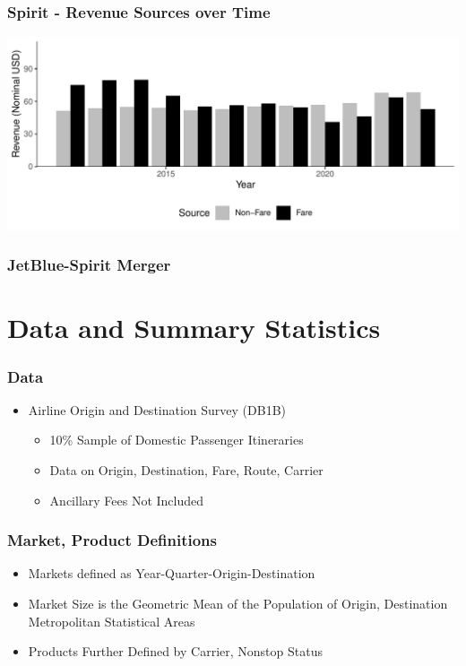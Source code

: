 \documentclass[xcolor=dvipsnames]{beamer}
\begin{document}
    \begin{frame}
     \frametitle{Spirit - Revenue Sources over Time}
        \includegraphics[width = \linewidth]{05.Figures/Spirit_Revenue_Sources.pdf}
    \end{frame}

    \begin{frame}
        \frametitle{JetBlue-Spirit Merger}
    \end{frame}


    \section{Data and Summary Statistics}

    \begin{frame}
		\frametitle{Data}
		\begin{itemize}
			\item Airline Origin and Destination Survey (DB1B)
			\begin{itemize}
				\item 10\% Sample of Domestic Passenger Itineraries 
				\item Data on Origin, Destination, Fare, Route, Carrier
                \item Ancillary Fees Not Included 
			\end{itemize}
		\end{itemize}
	\end{frame}


    \begin{frame}
        \frametitle{Market, Product Definitions}
        \begin{itemize}
        	\item Markets defined as Year-Quarter-Origin-Destination 
			\item Market Size is the Geometric Mean of the Population of Origin, Destination Metropolitan Statistical Areas
			\item Products Further Defined by Carrier, Nonstop Status
        \end{itemize}
    \end{frame}
\end{document}
